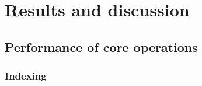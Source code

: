 \chapter{Results and discussion}
\section{Performance of core operations}

\subsection{Indexing}








